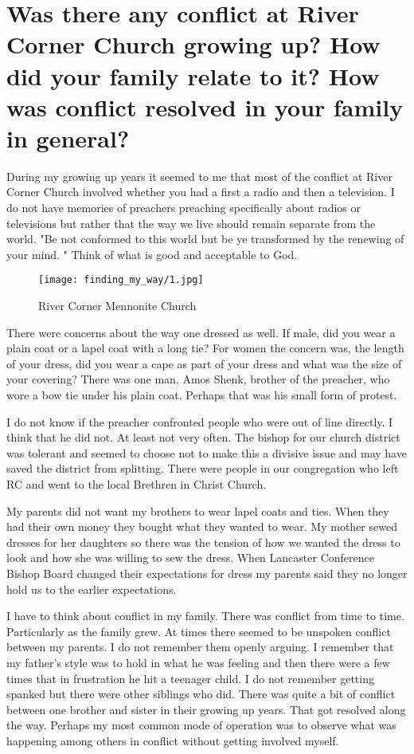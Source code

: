 \section{Was there any conflict at River Corner Church growing up? How did your family relate to it? How was conflict resolved in your family in general?}
During my growing up years it seemed to me that most of the conflict at River Corner Church involved whether you had a first a radio and then a television.
I do not have memories of preachers preaching specifically about radios or televisions but rather that the way we live should remain separate from the world.
"Be not conformed to this world but be ye transformed by the renewing of your mind.
" Think of what is good and acceptable to God.
\begin{figure}
\centering
\texttt{[image: finding\_my\_way/1.jpg]}
\caption{
River Corner Mennonite Church
}
\end{figure}

There were concerns about the way one dressed as well.
If male, did you wear a plain coat or a lapel coat with a long tie? For women the concern was, the length of your dress, did you wear a cape as part of your dress and what was the size of your covering?
There was one man, Amos Shenk, brother of the preacher, who wore a bow tie under his plain coat.
Perhaps that was his small form of protest.

I do not know if the preacher confronted people who were out of line directly.
I think that he did not.
At least not very often.
The bishop for our church district was tolerant and seemed to choose not to make this a divisive issue and may have saved the district from splitting.
There were people in our congregation who left RC and went to the local Brethren in Christ Church.

My parents did not want my brothers to wear lapel coats and ties.
When they had their own money they bought what they wanted to wear.
My mother sewed dresses for her daughters so there was the tension of how we wanted the dress to look and how she was willing to sew the dress.
When Lancaster Conference Bishop Board changed their expectations for dress my parents said they no longer hold us to the earlier expectations.

I have to think about conflict in my family.
There was conflict from time to time.
Particularly as the family grew.
At times there seemed to be unspoken conflict between my parents.
I do not remember them openly arguing.
I remember that my father's style was to hold in what he was feeling and then there were a few times that in frustration he hit a teenager child.
I do not remember getting spanked but there were other siblings who did.
There was quite a bit of conflict between one brother and sister in their growing up years.
That got resolved along the way.
Perhaps my most common mode of operation was to observe what was happening among others in conflict without getting involved myself.





